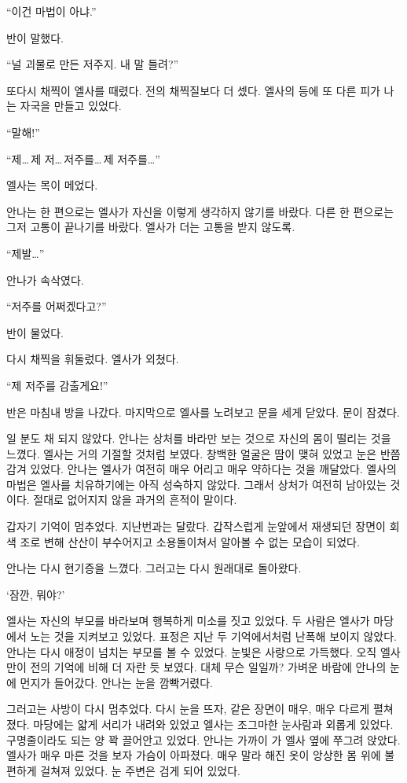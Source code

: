 ``이건 마법이 아냐.''

반이 말했다.

``널 괴물로 만든 저주지. 내 말 들려?''

또다시 채찍이 엘사를 때렸다. 전의 채찍질보다 더 셌다. 엘사의 등에 또 다른 피가 나는 자국을 만들고 있었다.

``말해!''

``제\ldots\,제 저\ldots\,저주를\ldots\,제 저주를\ldots''

엘사는 목이 메었다.

안나는 한 편으로는 엘사가 자신을 이렇게 생각하지 않기를 바랐다. 다른 한 편으로는 그저 고통이 끝나기를 바랐다. 엘사가 더는 고통을 받지 않도록.

``제발\ldots''

안나가 속삭였다.

``저주를 어쩌겠다고?''

반이 물었다.

다시 채찍을 휘둘렀다. 엘사가 외쳤다.

``제 저주를 감출게요!''

반은 마침내 방을 나갔다. 마지막으로 엘사를 노려보고 문을 세게 닫았다. 문이 잠겼다.

일 분도 채 되지 않았다. 안나는 상처를 바라만 보는 것으로 자신의 몸이 떨리는 것을 느꼈다. 엘사는 거의 기절할 것처럼 보였다. 창백한 얼굴은 땀이 맺혀 있었고 눈은 반쯤 감겨 있었다. 안나는 엘사가 여전히 매우 어리고 매우 약하다는 것을 깨달았다. 엘사의 마법은 엘사를 치유하기에는 아직 성숙하지 않았다. 그래서 상처가 여전히 남아있는 것이다. 절대로 없어지지 않을 과거의 흔적이 말이다.

갑자기 기억이 멈추었다. 지난번과는 달랐다. 갑작스럽게 눈앞에서 재생되던 장면이 회색 조로 변해 산산이 부수어지고 소용돌이쳐서 알아볼 수 없는 모습이 되었다.

안나는 다시 현기증을 느꼈다. 그러고는 다시 원래대로 돌아왔다.

`잠깐, 뭐야?'

엘사는 자신의 부모를 바라보며 행복하게 미소를 짓고 있었다. 두 사람은 엘사가 마당에서 노는 것을 지켜보고 있었다. 표정은 지난 두 기억에서처럼 난폭해 보이지 않았다. 안나는 다시 애정이 넘치는 부모를 볼 수 있었다. 눈빛은 사랑으로 가득했다. 오직 엘사만이 전의 기억에 비해 더 자란 듯 보였다. 대체 무슨 일일까? 가벼운 바람에 안나의 눈에 먼지가 들어갔다. 안나는 눈을 깜빡거렸다.

그러고는 사방이 다시 멈추었다. 다시 눈을 뜨자, 같은 장면이 매우, 매우 다르게 펼쳐졌다. 마당에는 얇게 서리가 내려와 있었고 엘사는 조그마한 눈사람과 외롭게 있었다. 구명줄이라도 되는 양 꽉 끌어안고 있었다. 안나는 가까이 가 엘사 옆에 쭈그려 앉았다. 엘사가 매우 마른 것을 보자 가슴이 아파졌다. 매우 말라 해진 옷이 앙상한 몸 위에 불편하게 걸쳐져 있었다. 눈 주변은 검게 되어 있었다.


